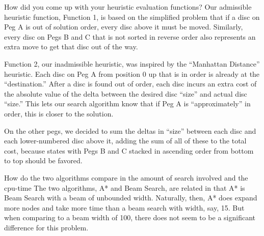 \documentclass{article}
\newenvironment{Question}[2][Question]{\begin{trivlist}
\item[\hskip \labelsep {\bfseries #1}\hskip \labelsep {\bfseries #2.}]}{\end{trivlist}}
\begin{document}
\begin{Question}{5}How did you come up with your heuristic evaluation functions?
Our admissible heuristic function, Function 1, is based on the simplified problem that if a disc on Peg A is out of solution order, every disc above it must be moved. Similarly, every disc on Pegs B and C that is not sorted in reverse order also represents an extra move to get that disc out of the way.

Function 2, our inadmissible heuristic, was inspired by the “Manhattan Distance” heuristic. Each disc on Peg A from position 0 up that is in order is already at the “destination.” After a disc is found out of order, each disc incurs an extra cost of the absolute value of the delta between the desired disc “size” and actual disc “size.” This lets our search algorithm know that if Peg A is “approximately” in order, this is closer to the solution. 

On the other pegs, we decided to sum the deltas in “size” between each disc and each lower-numbered disc above it, adding the sum of all of these to the total cost, because states with Pegs B and C stacked in ascending order from bottom to top should be favored.


\end{Question}



\begin{Question}{6} How do the two algorithms compare in the amount of search involved and the cpu-time
The two algorithms, A* and Beam Search, are related in that A* is Beam Search with a beam of unbounded width. Naturally, then, A* does expand more nodes and take more time than a beam search with width, say, 15. But when comparing to a beam width of 100, there does not seem to be a significant difference for this problem.

\end{Question}
\end{document}
